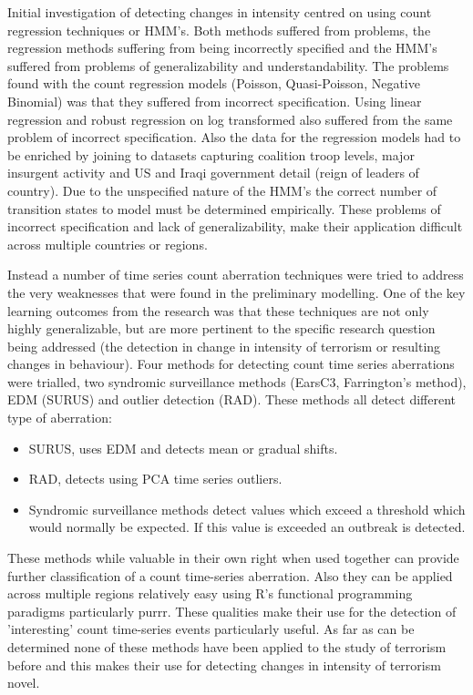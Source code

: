 Initial investigation of detecting changes in intensity centred on using count regression techniques or HMM's. Both methods suffered from problems, the regression methods suffering from being incorrectly specified and the HMM's suffered from problems of generalizability and understandability. The problems found with the count regression models (Poisson, Quasi-Poisson, Negative Binomial) was that they suffered from incorrect specification. Using linear regression  and robust regression on log transformed also suffered from the same problem of incorrect specification. Also the data for the regression models had to be enriched by joining to datasets capturing coalition troop levels, major insurgent activity and US and Iraqi government detail (reign of leaders of country). Due to the unspecified nature of the HMM's the correct number of transition states to model must be determined empirically. These problems of incorrect specification and lack of generalizability, make their application difficult across multiple countries or regions. 

Instead a number of time series count aberration techniques were tried to address the very weaknesses that were found in the preliminary modelling. One of the key learning outcomes from the research was that these techniques are not only highly generalizable, but are more pertinent to the specific research question being addressed (the detection in change in intensity of terrorism or resulting changes in behaviour). Four methods for detecting count time series aberrations were trialled, two syndromic surveillance methods (EarsC3, Farrington's method), EDM (SURUS) and outlier detection (RAD). These methods all detect different type of aberration:
\begin{itemize}
     \item SURUS, uses EDM and detects mean or gradual shifts.
     \item RAD, detects using PCA time series outliers.
     \item Syndromic surveillance methods detect values which exceed a threshold which would normally be expected. If this value is exceeded an outbreak is detected.
\end{itemize}     

These methods while valuable in their own right when used together can provide further classification of a count time-series aberration. Also they can be applied across multiple regions relatively easy using R's functional programming paradigms particularly purrr. These qualities make their use for the detection of 'interesting' count time-series events particularly useful. As far as can be determined none of these methods have been applied to the study of terrorism before and this makes their use for detecting changes in intensity of terrorism novel.

